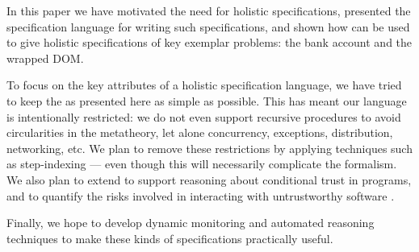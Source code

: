 In this paper we have motivated the need for holistic specifications,
presented the \Chainmail specification language for writing such
specifications, and shown how \Chainmail can be used to give holistic
specifications of key exemplar problems: the bank account and the
wrapped DOM.

To focus on the key attributes of a holistic specification language,
we have tried to keep the \Chainmail as presented here as simple as
possible. This has meant our language is intentionally restricted: we
do not even support recursive procedures to avoid circularities in the
metatheory, let alone concurrency, exceptions, distribution,
networking, etc.  We plan to remove these restrictions by applying
techniques such as step-indexing \cite{dd} --- even though this will
necessarily complicate the formalism.
%
We also plan to extend \Chainmail to support reasoning about
conditional trust in programs, and to quantify the risks involved in
interacting with untrustworthy software \cite{swapsies}.

Finally, we hope to develop dynamic monitoring and
automated reasoning techniques to make these kinds of specifications
practically useful.
